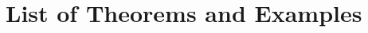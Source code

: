 \documentclass[doctor]{iscs-thesis}
\date{\fix{XXX}}
\begin{document}


\maketitle



\frontmatter
\tableofcontents

\listoffigures

\chapter*{List of Theorems and Examples}


\mainmatter



% 





\printindex




\appendix
\end{document}
